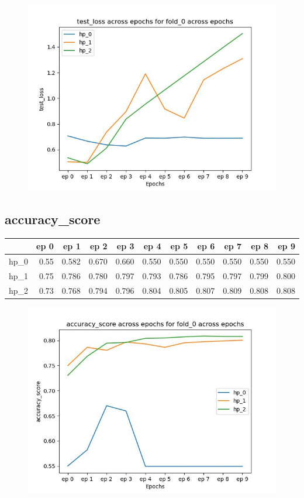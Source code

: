 \documentclass{article}
\begin{document}
\begin{figure}[H]
\includegraphics[scale = 0.75]{fold_0/test_loss}
\end{figure}
\subsection{accuracy\_score}
\begin{tabular}{lrrrrrrrrrr}
\toprule
{} &  ep 0 &   ep 1 &   ep 2 &   ep 3 &   ep 4 &   ep 5 &   ep 6 &   ep 7 &   ep 8 &   ep 9 \\
\midrule
hp\_0 &  0.55 &  0.582 &  0.670 &  0.660 &  0.550 &  0.550 &  0.550 &  0.550 &  0.550 &  0.550 \\
hp\_1 &  0.75 &  0.786 &  0.780 &  0.797 &  0.793 &  0.786 &  0.795 &  0.797 &  0.799 &  0.800 \\
hp\_2 &  0.73 &  0.768 &  0.794 &  0.796 &  0.804 &  0.805 &  0.807 &  0.809 &  0.808 &  0.808 \\
\bottomrule
\end{tabular}

\begin{figure}[H]
\includegraphics[scale = 0.75]{fold_0/accuracy_score}
\end{figure}
\end{document}
